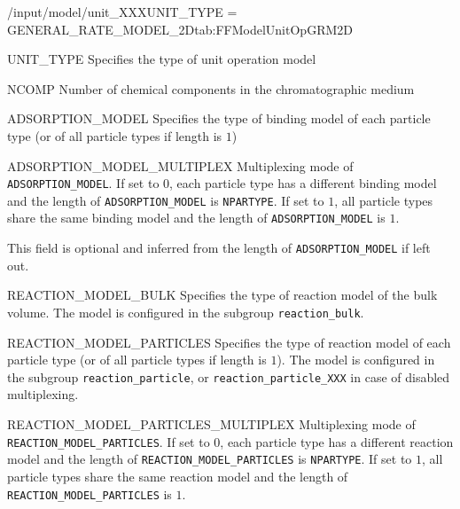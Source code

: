 \begin{condsubgroup}{/input/model/unit\_XXX}{UNIT\_TYPE = GENERAL\_RATE\_MODEL\_2D}{tab:FFModelUnitOpGRM2D}
  \begin{dataset}[type=string,range={\texttt{GENERAL\_RATE\_MODEL\_2D}},length=1]{UNIT\_TYPE}
    Specifies the type of unit operation model
  \end{dataset}
  \begin{dataset}[type=int,range={$\geq 1$},length=1]{NCOMP}
    Number of chemical components in the chromatographic medium
  \end{dataset}
  \begin{dataset}[type=string,range={See Section~\ref{sec:FFAdsorption}},length={$1$ / \texttt{NPARTYPE}}]{ADSORPTION\_MODEL}
    Specifies the type of binding model of each particle type (or of all particle types if length is $1$)
  \end{dataset}
  \begin{dataset}[unit=--,type=int,range={$\{0, 1\}$},length={1}]{ADSORPTION\_MODEL\_MULTIPLEX}
    Multiplexing mode of \texttt{ADSORPTION\_MODEL}.
    If set to $0$, each particle type has a different binding model and the length of \texttt{ADSORPTION\_MODEL} is \texttt{NPARTYPE}.
    If set to $1$, all particle types share the same binding model and the length of \texttt{ADSORPTION\_MODEL} is $1$.

    This field is optional and inferred from the length of \texttt{ADSORPTION\_MODEL} if left out.
  \end{dataset}
  \begin{dataset}[type=string,range={See Section~\ref{sec:FFReaction}},length=1]{REACTION\_MODEL\_BULK}
    Specifies the type of reaction model of the bulk volume.
    The model is configured in the subgroup \texttt{reaction\_bulk}.
  \end{dataset}
  \begin{dataset}[type=string,range={See Section~\ref{sec:FFReaction}},length={$1$ / \texttt{NPARTYPE}}]{REACTION\_MODEL\_PARTICLES}
    Specifies the type of reaction model of each particle type (or of all particle types if length is $1$).
    The model is configured in the subgroup \texttt{reaction\_particle}, or \texttt{reaction\_particle\_XXX} in case of disabled multiplexing.
  \end{dataset}
  \begin{dataset}[unit=--,type=int,range={$\{0, 1\}$},length={1}]{REACTION\_MODEL\_PARTICLES\_MULTIPLEX}
    Multiplexing mode of \texttt{REACTION\_MODEL\_PARTICLES}.
    If set to $0$, each particle type has a different reaction model and the length of \texttt{REACTION\_MODEL\_PARTICLES} is \texttt{NPARTYPE}.
    If set to $1$, all particle types share the same reaction model and the length of \texttt{REACTION\_MODEL\_PARTICLES} is $1$.


\end{dataset}
\end{condsubgroup}
